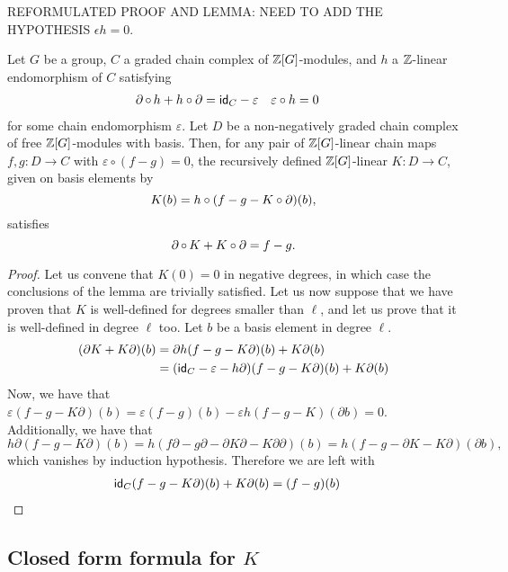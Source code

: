 \noindent REFORMULATED PROOF AND LEMMA: NEED TO ADD THE HYPOTHESIS $\epsilon h =0$.

\begin{lemma}
	Let $G$ be a group, $C$ a graded chain complex of $\mathbb{Z}[G]$-modules, and $h$ a $\mathbb{Z}$-linear endomorphism of $C$ satisfying
	\begin{align*}
	\operatorname{\partial} \circ \, h + h \circ \operatorname{\partial} &= \mathsf{id}_C - \varepsilon
    &
    \varepsilon\circ h &= 0
	\end{align*}
	for some chain endomorphism $\varepsilon$. Let $D$ be a non-negatively graded chain complex of free $\mathbb{Z}[G]$-modules with basis.
	Then, for any pair of $\mathbb{Z}[G]$-linear chain maps $f,g \colon D \to C$ with $\varepsilon \circ (f-g) = 0$, the recursively defined $\mathbb{Z}[G]$-linear $K \colon D \to C$, given on basis elements by
	\[
	K(b) = h \circ (f - g - K \circ \operatorname{\partial})(b),
	\]
	satisfies
	\[
	\operatorname{\partial} \circ \, K + K \circ \operatorname{\partial} = f - g.
	\]
\end{lemma}

\begin{proof} Let us convene that $K(0) = 0$ in negative degrees, in which case the conclusions of the lemma are trivially satisfied. Let us now suppose that we have proven that $K$ is well-defined for degrees smaller than $\ell$, and let us prove that it is well-defined in degree $\ell$ too. Let $b$ be a basis element in degree $\ell$.
\begin{align*}
    (\partial K+ K\partial)(b)
    &= \partial h(f-g-K\partial)(b) + K\partial(b) \\
    &= (\mathsf{id}_C-\varepsilon-h\partial)(f-g-K\partial)(b)+K\partial(b)
\end{align*}
Now, we have that $\varepsilon(f-g-K\partial)(b) = \varepsilon(f-g)(b) - \varepsilon h(f-g-K)(\partial b) = 0$. Additionally, we have that 
\[h\partial (f-g-K\partial)(b) = h(f\partial-g\partial-\partial K\partial - K\partial\partial)(b) = h(f-g-\partial K - K\partial)(\partial b),
\] 
which vanishes by induction hypothesis. Therefore we are left with
\begin{align*}
    \mathsf{id}_C(f-g-K\partial)(b)+K\partial(b) &= (f-g)(b) \qedhere
\end{align*}
\end{proof}

\subsection{Closed form formula for $K$}


